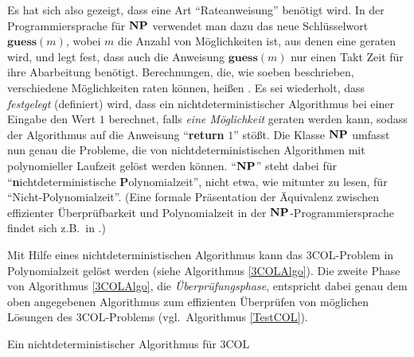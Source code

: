 Es hat sich also gezeigt, dass eine Art "`Rateanweisung"' benötigt
wird. In der Programmiersprache für $\mathbf{N}\mathbf{P}$ verwendet man dazu das neue
Schlüsselwort $\mathbf{guess}(m)$, wobei $m$ die Anzahl von
Möglichkeiten ist, aus denen eine geraten wird, und legt fest, dass
auch die Anweisung $\mathbf{guess}(m)$ nur einen Takt Zeit für ihre
Abarbeitung benötigt.  Berechnungen, die, wie soeben beschrieben,
verschiedene Möglichkeiten raten können, heißen
. Es sei wiederholt, dass \emph{festgelegt}
(definiert) wird, dass ein nichtdeterministischer Algorithmus bei
einer Eingabe den Wert $1$ berechnet, falls \emph{eine
Möglichkeit} geraten werden kann, sodass der Algorithmus auf die
Anweisung "`\textbf{return} $1$"' stößt. Die Klasse $\mathbf{N}\mathbf{P}$
umfasst nun genau die Probleme, die von nichtdeterministischen
Algorithmen mit polynomieller Laufzeit gelöst werden können.
"`$\mathbf{N}\mathbf{P}$"' steht dabei für
"`\textbf{n}ichtdeterministi\-sche \textbf{P}olynomialzeit"', nicht
etwa, wie mitunter zu lesen, für "`Nicht-Polynomialzeit"'.  (Eine
formale Präsentation der Äquivalenz zwischen effizienter
Überprüfbarkeit und Polynomialzeit in der $\mathbf{N}\mathbf{P}$-Pro\-gram\-miersprache
findet sich z.B.~in \cite[Kapitel 2.3]{GaJo79}.)

Mit Hilfe eines nichtdeterministischen Algorithmus kann das
$3\mathrm{COL}$-Problem in Polynomialzeit gelöst werden (siehe
Algorithmus \ref{3COLAlgo}). Die zweite Phase von
Algorithmus \ref{3COLAlgo}, die
\emph{Überprüfungsphase}, 
entspricht dabei genau dem oben angegebenen Algorithmus zum
effizienten Überprüfen von möglichen Lösungen des
$3\mathrm{COL}$-Problems (vgl.~Algorithmus \ref{TestCOL}).

\begin{algorithm}
\caption{Ein nichtdeterministischer Algorithmus für $3\mathrm{COL}$}
\label{3COLAlgo}
\BlankLine
{}
\end{algorithm}

